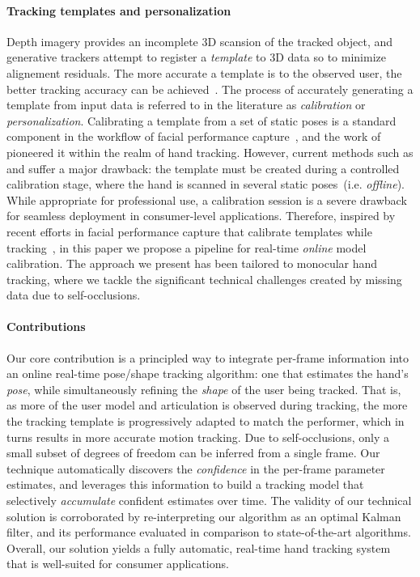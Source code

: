 \paragraph{Tracking templates and personalization}
Depth imagery provides an incomplete 3D scansion of the tracked object, and generative trackers attempt to register a \emph{template} to 3D data so to minimize alignement residuals. The more accurate a template is to the observed user, the better tracking accuracy can be achieved~\cite{tkach2016sphere,taylor2016joint}. The process of accurately generating a template from input data is referred to in the literature as \emph{calibration} or \emph{personalization}. 
Calibrating a template from a set of static poses is a standard component in the workflow of facial performance capture~\cite{weise2011realtime,thabo}, and the work of  \cite{taylor2014user} pioneered it within the realm of hand tracking. However, current methods such as \cite{taylor2016joint} and \cite{tkach2016sphere} suffer a major drawback: the template must be created during a controlled calibration stage, where the hand is scanned in several static poses~(i.e. \emph{offline}). While appropriate for professional use, a calibration session is a severe drawback for seamless deployment in consumer-level applications.
Therefore, inspired by recent efforts in facial performance capture that calibrate templates while tracking~\cite{li_sig13,bouaziz2013online}, in this paper we propose a pipeline for real-time \emph{online} model calibration. The approach we present has been tailored to monocular hand tracking, where we tackle the significant technical challenges created by missing data due to self-occlusions.

\paragraph{Contributions}
Our core contribution is a principled way to integrate per-frame information into an online real-time pose/shape tracking algorithm: one that estimates the hand's \emph{pose}, while simultaneously refining the \emph{shape} of the user being tracked. That is, as more of the user model and articulation is observed during tracking, the more the tracking template is progressively adapted to match the performer, which in turns results in more accurate motion tracking. Due to self-occlusions, only a small subset of degrees of freedom can be inferred from a single frame. Our technique automatically discovers the \emph{confidence} in the per-frame parameter estimates, and leverages this information to build a tracking model that selectively \emph{accumulate} confident estimates over time. The validity of our technical solution is corroborated by re-interpreting our algorithm as an optimal Kalman filter, and its performance evaluated in comparison to state-of-the-art algorithms. Overall, our solution yields a fully automatic, real-time hand tracking system that is well-suited for consumer applications.
